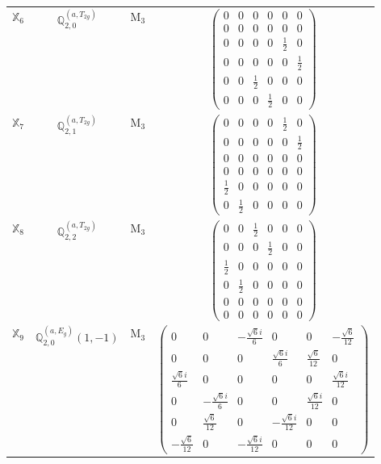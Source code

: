 \documentclass[fleqn,10pt,landscape]{article}
\begin{document}
\begin{itemize}
\begin{center}
\begin{longtable}{c|c|c|c}
$ \mathbb{X}_{6} $ & $\mathbb{Q}_{2,0}^{(a,T_{2g})}$ & M$_{3}$ & $\begin{pmatrix} 0 & 0 & 0 & 0 & 0 & 0 \\ 0 & 0 & 0 & 0 & 0 & 0 \\ 0 & 0 & 0 & 0 & \frac{1}{2} & 0 \\ 0 & 0 & 0 & 0 & 0 & \frac{1}{2} \\ 0 & 0 & \frac{1}{2} & 0 & 0 & 0 \\ 0 & 0 & 0 & \frac{1}{2} & 0 & 0 \end{pmatrix}$ \\
$ \mathbb{X}_{7} $ & $\mathbb{Q}_{2,1}^{(a,T_{2g})}$ & M$_{3}$ & $\begin{pmatrix} 0 & 0 & 0 & 0 & \frac{1}{2} & 0 \\ 0 & 0 & 0 & 0 & 0 & \frac{1}{2} \\ 0 & 0 & 0 & 0 & 0 & 0 \\ 0 & 0 & 0 & 0 & 0 & 0 \\ \frac{1}{2} & 0 & 0 & 0 & 0 & 0 \\ 0 & \frac{1}{2} & 0 & 0 & 0 & 0 \end{pmatrix}$ \\
$ \mathbb{X}_{8} $ & $\mathbb{Q}_{2,2}^{(a,T_{2g})}$ & M$_{3}$ & $\begin{pmatrix} 0 & 0 & \frac{1}{2} & 0 & 0 & 0 \\ 0 & 0 & 0 & \frac{1}{2} & 0 & 0 \\ \frac{1}{2} & 0 & 0 & 0 & 0 & 0 \\ 0 & \frac{1}{2} & 0 & 0 & 0 & 0 \\ 0 & 0 & 0 & 0 & 0 & 0 \\ 0 & 0 & 0 & 0 & 0 & 0 \end{pmatrix}$ \\
$ \mathbb{X}_{9} $ & $\mathbb{Q}_{2,0}^{(a,E_{g})}(1,-1)$ & M$_{3}$ & $\begin{pmatrix} 0 & 0 & - \frac{\sqrt{6} i}{6} & 0 & 0 & - \frac{\sqrt{6}}{12} \\ 0 & 0 & 0 & \frac{\sqrt{6} i}{6} & \frac{\sqrt{6}}{12} & 0 \\ \frac{\sqrt{6} i}{6} & 0 & 0 & 0 & 0 & \frac{\sqrt{6} i}{12} \\ 0 & - \frac{\sqrt{6} i}{6} & 0 & 0 & \frac{\sqrt{6} i}{12} & 0 \\ 0 & \frac{\sqrt{6}}{12} & 0 & - \frac{\sqrt{6} i}{12} & 0 & 0 \\ - \frac{\sqrt{6}}{12} & 0 & - \frac{\sqrt{6} i}{12} & 0 & 0 & 0 \end{pmatrix}$ \\

\end{longtable}
\end{center}
\end{itemize}
\end{document}
